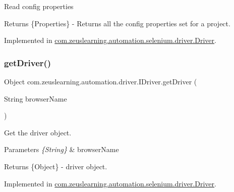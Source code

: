 Read config properties

\begin{DoxyReturn}{Returns}
\{Properties\} -\/ Returns all the config properties set for a project. 
\end{DoxyReturn}


Implemented in \hyperlink{classcom_1_1zeuslearning_1_1automation_1_1selenium_1_1driver_1_1Driver_aa9b92da3b234318fa721d62da577debf}{com.\+zeuslearning.\+automation.\+selenium.\+driver.\+Driver}.

\hypertarget{interfacecom_1_1zeuslearning_1_1automation_1_1driver_1_1IDriver_a9c4bbcfcf72e1b1f556c7c8298dc8e2a}{}\label{interfacecom_1_1zeuslearning_1_1automation_1_1driver_1_1IDriver_a9c4bbcfcf72e1b1f556c7c8298dc8e2a} 
\subsubsection{\texorpdfstring{get\+Driver()}{getDriver()}}
{\footnotesize\ttfamily Object com.\+zeuslearning.\+automation.\+driver.\+I\+Driver.\+get\+Driver (\begin{DoxyParamCaption}\item[{String}]{browser\+Name }\end{DoxyParamCaption})}

Get the driver object.


\begin{DoxyParams}{Parameters}
{\em \{\+String\}} & browser\+Name \\
\hline
\end{DoxyParams}
\begin{DoxyReturn}{Returns}
\{Object\} -\/ driver object. 
\end{DoxyReturn}


Implemented in \hyperlink{classcom_1_1zeuslearning_1_1automation_1_1selenium_1_1driver_1_1Driver_acf213a93d95506c1aa26b4e1b4154183}{com.\+zeuslearning.\+automation.\+selenium.\+driver.\+Driver}.

\hypertarget{interfacecom_1_1zeuslearning_1_1automation_1_1driver_1_1IDriver_a5662e9a248835364fcd27b0df392c3ea}{}\label{interfacecom_1_1zeuslearning_1_1automation_1_1driver_1_1IDriver_a5662e9a248835364fcd27b0df392c3ea} 

